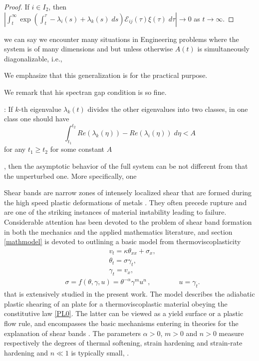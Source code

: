 \documentclass[a4paper,11pt]{article}
\theoremstyle{remark}
\begin{document}
\begin{proof}
If $i\in I_2$, then $\left|\int_t^\infty \exp\left(\int_t^\tau -\lambda_i(s)+\lambda_k(s) \; ds\right)\mathcal{E}_{ij}(\tau)\xi(\tau) \; d\tau\right| \rightarrow 0$ as $t \rightarrow \infty$.
\end{proof}

we can say we encounter many situations in Engineering problems where the system is of many dimensions and but unless otherwise $A(t)$ is simultaneously diagonalizable, i.e., 



We emphasize that this generalization is for the practical purpose. 


We remark that his spectran gap condition is so fine.





: If $k$-th eigenvalue $\lambda_k(t)$ divides the other eigenvalues into two classes, in one class one should have
$$\int_{t_1}^{t_2} Re(\lambda_k(\eta)) - Re(\lambda_i(\eta)) \; d\eta < A$$
for any $t_1 \ge t_2$ for some constant $A$


, then the asymptotic behavior of the full system can be not different from that the unperturbed one. More specifically, one 







Shear bands are narrow zones of intensely localized shear that are formed during the high speed plastic deformations of metals \cite{ZH44, Clifton90,Wright02}.
They often precede rupture and are one of the striking instances of material instability leading to failure.  Considerable attention has been devoted to the
problem of shear band formation in both the mechanics and the applied mathematics literature, and section \ref{mathmodel} is devoted to outlining
a basic model from thermoviscoplasticity
\begin{equation}
  \label{sbeq}
  \begin{aligned}
    & v_{t} =  \kappa \theta_{ x x} +  \sigma_{x},\\
    & \theta_{t} =  \sigma \gamma_{t}, \\
    & \gamma_{t} = v_{x},
  \end{aligned}
\end{equation}
\begin{align}
&  \sigma =  f(\theta, \gamma, u) = \theta^{-\alpha} \gamma^{m} u^{n} \, , \quad \quad \qquad \text{$u = \gamma_t$}. \label{PL0}
\end{align}
that is extensively studied in the present work. The model describes the adiabatic plastic shearing of an plate for
a thermoviscoplastic material obeying the constitutive law \eqref{PL0}. The latter can be viewed as a yield surface or a plastic flow rule, and encompasses the basic
mechanisms entering in theories for the explanation of shear bands \cite{ZH44,Clifton90}.
The parameters $\alpha>0$, $m>0$ and $n>0$ measure respectively the degrees of thermal softening, strain hardening and  strain-rate hardening and $n \ll 1$
is typically small, \cite{Clifton90}.
\end{document}

